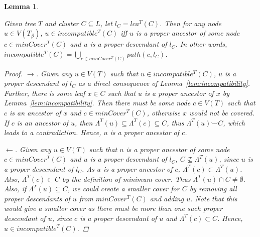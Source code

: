 \documentclass{article}
\newcommand{\compatible}{\smile}
\newcommand{\leafset}{\Lambda}
\newcommand{\TB}{T_\beta}
\newtheorem{incompatibilitymincover}[incompatibility]{Lemma}
\begin{document}
    \begin{incompatibilitymincover}
        \label{lem:incompatibilitymincover}

        Given tree $T$ and cluster $C \subseteq L$, let $l_C = lca^{T}(C)$. Then for any node $u \in V(\TB)$, $u \in incompatible^{T}(C)$ iff $u$ is a proper ancestor of some node $c \in minCover^{T}(C)$ and $u$ is a proper descendant of $l_C$. In other words, $incompatible^{T}(C) = \bigcup_{c \in minCover^{T}(C)} path(c, l_C)$.

        \begin{proof}
            $\longrightarrow$. Given any $u \in V(T)$ such that $u \in incompatible^{T}(C)$, $u$ is a proper descendant of $l_C$ as a direct consequence of Lemma~\ref{lem:incompatibility}. Further, there is some leaf $x \in C$ such that $u$ is a proper ancestor of $x$ by Lemma~\ref{lem:incompatibility}. Then there must be some node $c \in V(T)$ such that $c$ is an ancestor of $x$ and $c \in minCover^{T}(C)$, otherwise $x$ would not be covered. If $c$ is an ancestor of $u$, then $\leafset^{T}(u) \subseteq \leafset^{T}(c) \subseteq C$, thus $\leafset^{T}(u) \compatible C$, which leads to a contradiction. Hence, $u$ is a proper ancestor of $c$.

            $\longleftarrow$. Given any $u \in V(T)$ such that $u$ is a proper ancestor of some node $c \in minCover^{T}(C)$ and $u$ is a proper descendant of $l_C$, $C \not\subseteq \leafset^{T}(u)$, since $u$ is a proper descendant of $l_C$. As $u$ is a proper ancestor of $c$, $\leafset^{T}(c) \subset \leafset^{T}(u)$. Also, $\leafset^{T}(c) \subset C$ by the definition of minimum cover. Thus $\leafset^{T}(u) \cap C \neq \emptyset$. Also, if $\leafset^{T}(u) \subseteq C$, we could create a smaller cover for $C$ by removing all proper descendants of $u$ from $minCover^{T}(C)$ and adding $u$. Note that this would give a smaller cover as there must be more than one such proper descendant of $u$, since $c$ is a proper descendant of $u$ and $\leafset^{T}(c) \subset C$. Hence, $u \in incompatible^{T}(C)$.
        \end{proof}
    \end{incompatibilitymincover}
\end{document}
